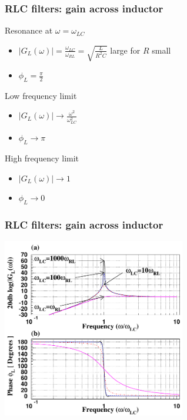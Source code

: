 \documentclass[beamer]{standalone}
\begin{document}
\begin{frame}
 \frametitle{RLC filters: gain across inductor}
 \begin{block}{Resonance at $\omega = \omega_{LC}$}
  \begin{itemize}
   \item $|G_L(\omega)| = \frac{\omega_{LC}}{\omega_{RL}} = \sqrt{\frac{L}{R^2 C}}$ large for $R$ small
   \item $\phi_L = \frac{\pi}{2}$
  \end{itemize}
 \end{block}
 \begin{block}{Low frequency limit}
  \begin{itemize}
   \item $|G_L(\omega)| \to \frac{\omega^2}{\omega_{LC}^2}$
   \item $\phi_L \to \pi$
  \end{itemize}
 \end{block}
 \begin{block}{High frequency limit}
  \begin{itemize}
   \item $|G_L(\omega)| \to 1$
   \item $\phi_L \to 0$
  \end{itemize}
 \end{block}
\end{frame}

\begin{frame}
 \frametitle{RLC filters: gain across inductor}
 \begin{center}
  \includegraphics[width=0.6\textwidth]{pics/RLC_bode_inductor}
 \end{center}
\end{frame}
\end{document}
